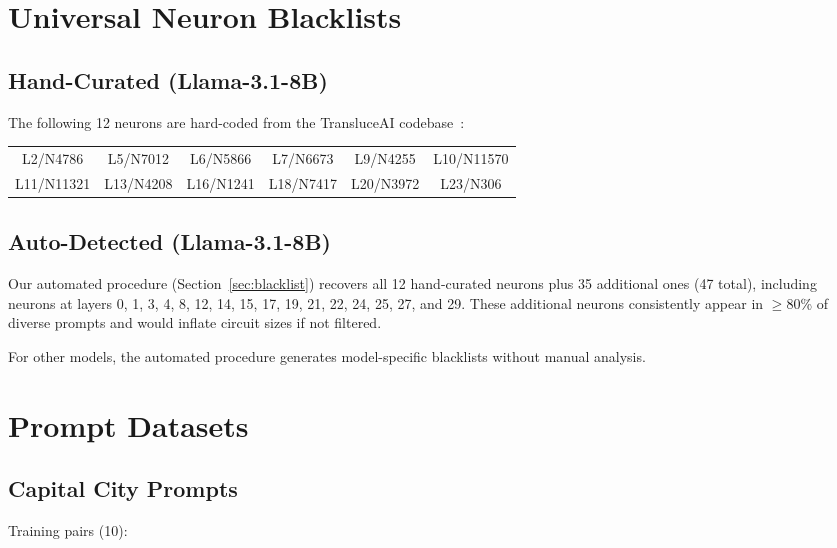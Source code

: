 \documentclass[11pt]{article}
\begin{document}
\section{Universal Neuron Blacklists}
\label{sec:blacklist_appendix}

\subsection{Hand-Curated (Llama-3.1-8B)}

The following 12 neurons are hard-coded from the TransluceAI codebase~\citep{arora2025circuits}:

\begin{center}
\begin{small}
\begin{tabular}{cccccc}
\toprule
L2/N4786 & L5/N7012 & L6/N5866 & L7/N6673 & L9/N4255 & L10/N11570 \\
L11/N11321 & L13/N4208 & L16/N1241 & L18/N7417 & L20/N3972 & L23/N306 \\
\bottomrule
\end{tabular}
\end{small}
\end{center}

\subsection{Auto-Detected (Llama-3.1-8B)}

Our automated procedure (Section~\ref{sec:blacklist}) recovers all 12 hand-curated neurons plus 35 additional ones (47 total), including neurons at layers 0, 1, 3, 4, 8, 12, 14, 15, 17, 19, 21, 22, 24, 25, 27, and 29.
These additional neurons consistently appear in $\geq$80\% of diverse prompts and would inflate circuit sizes if not filtered.

For other models, the automated procedure generates model-specific blacklists without manual analysis.


\section{Prompt Datasets}
\label{sec:prompts}

\subsection{Capital City Prompts}

Training pairs (10):
\end{document}
